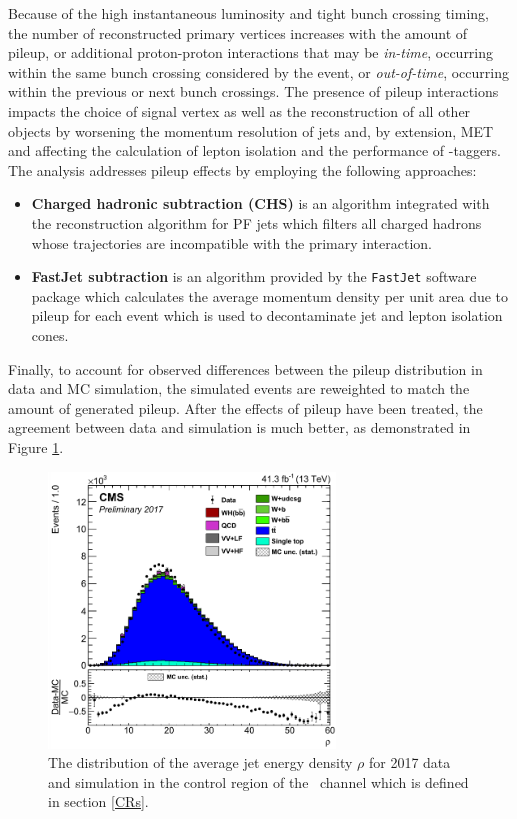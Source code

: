 Because of the high instantaneous luminosity and tight bunch crossing timing, the number of reconstructed primary vertices increases with the amount of pileup, or additional proton-proton interactions that may be \textit{in-time}, occurring within the same bunch crossing considered by the event, or \textit{out-of-time}, occurring within the previous or next bunch crossings. The presence of pileup interactions impacts the choice of signal vertex as well as the reconstruction of all other objects by worsening the momentum resolution of jets and, by extension, MET and affecting the calculation of lepton isolation and the performance of \qrkb-taggers. The analysis addresses pileup effects by employing the following approaches:
\begin{itemize}
  \item \textbf{Charged hadronic subtraction (CHS)} is an algorithm integrated with the reconstruction algorithm for PF jets which filters all charged hadrons whose trajectories are incompatible with the primary interaction.
  \item \textbf{FastJet subtraction} is an algorithm provided by the \texttt{FastJet}\cite{FASTJET} software package which calculates the average momentum density per unit area due to pileup for each event which is used to decontaminate jet and lepton isolation cones.
\end{itemize}
Finally, to account for observed differences between the pileup distribution in data and MC simulation, the simulated events are reweighted to match the amount of generated pileup. After the effects of pileup have been treated, the agreement between data and simulation is much better, as demonstrated in Figure \ref{fig:rho}.

\begin{figure}[htbp]
  \centering
    \includegraphics[width=3in]{images/rho}
    \caption[Average Jet Energy Density in 2017 Data]{The distribution of the average jet energy density $\rho$ for 2017 data and simulation in the \qrkt\qrktbar control region of the \WlnH\ channel which is defined in section \ref{CRs}.}
    \label{fig:rho}
\end{figure}

